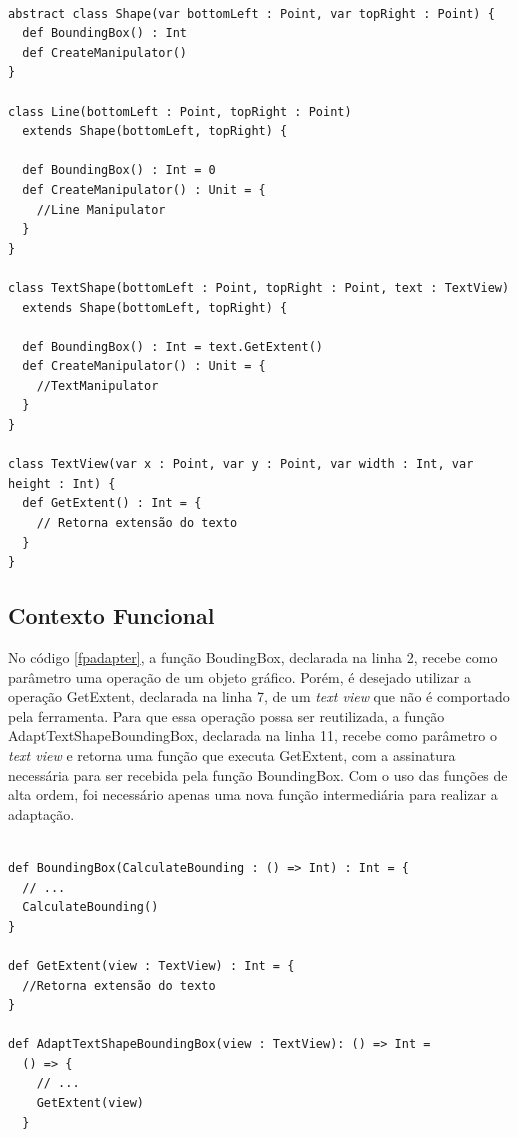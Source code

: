 \begin{lstlisting}[caption={Adapter Orientado a Objetos},label=ooadapter]

abstract class Shape(var bottomLeft : Point, var topRight : Point) {
  def BoundingBox() : Int
  def CreateManipulator()
}

class Line(bottomLeft : Point, topRight : Point)
  extends Shape(bottomLeft, topRight) {

  def BoundingBox() : Int = 0
  def CreateManipulator() : Unit = {
    //Line Manipulator
  }
}

class TextShape(bottomLeft : Point, topRight : Point, text : TextView)
  extends Shape(bottomLeft, topRight) {

  def BoundingBox() : Int = text.GetExtent()
  def CreateManipulator() : Unit = {
    //TextManipulator
  }
}

class TextView(var x : Point, var y : Point, var width : Int, var height : Int) {
  def GetExtent() : Int = {
    // Retorna extensão do texto
  }
}

\end{lstlisting}

\subsection*{Contexto Funcional}

No código \ref{fpadapter}, a função BoudingBox, declarada 
na linha 2, recebe como parâmetro uma operação de um 
objeto gráfico. Porém, é desejado utilizar a operação 
GetExtent, declarada na linha 7, de um \textit{text view} 
que não é comportado pela ferramenta. Para que essa 
operação possa ser reutilizada, a função 
AdaptTextShapeBoundingBox, declarada na linha 11, 
recebe como parâmetro o \textit{text view} e retorna 
uma função que executa GetExtent, com a assinatura 
necessária para ser recebida pela função BoundingBox. 
Com o uso das funções de alta ordem, foi necessário 
apenas uma nova função intermediária para realizar a 
adaptação.

\begin{lstlisting}[caption={Adapter Funcional},label=fpadapter]
    
def BoundingBox(CalculateBounding : () => Int) : Int = {
  // ...
  CalculateBounding()
}

def GetExtent(view : TextView) : Int = {
  //Retorna extensão do texto
}

def AdaptTextShapeBoundingBox(view : TextView): () => Int =
  () => {
    // ...
    GetExtent(view)
  }
    
\end{lstlisting}